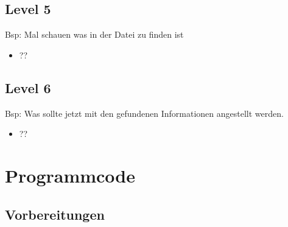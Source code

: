 \documentclass[a4paper 11pt]{article}
\begin{document}
\subsection{Level 5}
Bsp: Mal schauen was in der Datei zu finden ist

\begin{itemize}
\addtolength{\itemindent}{0.80cm}
\itemsep0em
\item ??
\end{itemize}

\subsection{Level 6}
Bsp: Was sollte jetzt mit den gefundenen Informationen angestellt werden.

\begin{itemize}
\addtolength{\itemindent}{0.80cm}
\itemsep0em
\item ??
\end{itemize}

\normalsize
\newpage
\appendix{} %
\section{Programmcode}
\subsection{Vorbereitungen}
\end{document}
